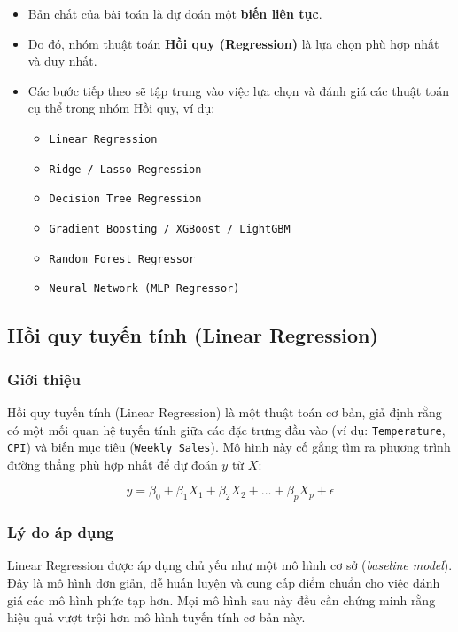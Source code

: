 \begin{itemize}
    \item Bản chất của bài toán là dự đoán một \textbf{biến liên tục}.
    \item Do đó, nhóm thuật toán \textbf{Hồi quy (Regression)} là lựa chọn phù hợp nhất và duy nhất.
    \item Các bước tiếp theo sẽ tập trung vào việc lựa chọn và đánh giá các thuật toán cụ thể trong nhóm Hồi quy, ví dụ:
    \begin{itemize}
        \item \texttt{Linear Regression}
        \item \texttt{Ridge / Lasso Regression}
        \item \texttt{Decision Tree Regression}
        \item \texttt{Gradient Boosting / XGBoost / LightGBM}
        \item \texttt{Random Forest Regressor}
        \item \texttt{Neural Network (MLP Regressor)}
    \end{itemize}
\end{itemize}

\subsection{Hồi quy tuyến tính (Linear Regression)}

\subsubsection{Giới thiệu}
Hồi quy tuyến tính (Linear Regression) là một thuật toán cơ bản, giả định rằng có một mối quan hệ tuyến tính giữa các đặc trưng đầu vào (ví dụ: \texttt{Temperature}, \texttt{CPI}) và biến mục tiêu (\texttt{Weekly\_Sales}).  
Mô hình này cố gắng tìm ra phương trình đường thẳng phù hợp nhất để dự đoán $y$ từ $X$:

\begin{equation}
y = \beta_0 + \beta_1X_1 + \beta_2X_2 + \dots + \beta_pX_p + \epsilon
\end{equation}

\subsubsection{Lý do áp dụng}
Linear Regression được áp dụng chủ yếu như một mô hình cơ sở (\textit{baseline model}).  
Đây là mô hình đơn giản, dễ huấn luyện và cung cấp điểm chuẩn cho việc đánh giá các mô hình phức tạp hơn.  
Mọi mô hình sau này đều cần chứng minh rằng hiệu quả vượt trội hơn mô hình tuyến tính cơ bản này.

